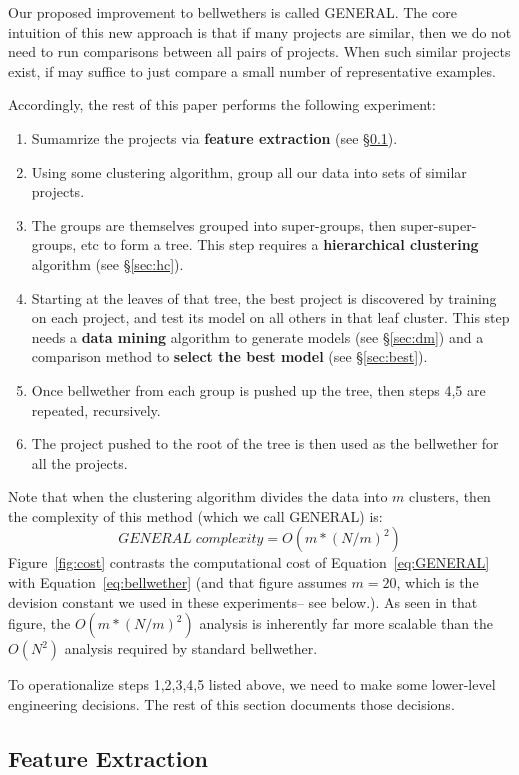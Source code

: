 \documentclass[10pt,journal,compsoc]{IEEEtran}
\newcommand{\fig}[1]{Figure~\ref{fig:#1}}
\newcommand{\be}{\begin{enumerate}}
\newcommand{\ee}{\end{enumerate}}
\begin{document}
 Our proposed improvement to bellwethers is called GENERAL. The core intuition of this new approach is that if many projects are similar, then we do not need to run comparisons between all pairs of projects. When such similar projects exist, if may suffice to just compare a small number of   representative examples. 
 
 Accordingly, the rest of this paper performs the following experiment:
 \be
 \item Sumamrize the projects via {\bf feature extraction} (see \S\ref{sec:fx}).
 \item Using some clustering algorithm, group all our data into sets of similar projects.
 \item The groups are themselves grouped into super-groups, then super-super-groups, etc to form a tree.  This step requires a {\bf hierarchical clustering} algorithm (see \S\ref{sec:hc}).
 \item Starting at the leaves of that tree,   the best project is discovered by training on each project, and test its model
 on all others in that leaf cluster.
 This step needs
  a {\bf data mining} algorithm to generate models (see \S\ref{sec:dm})
 and  a comparison method to {\bf select the best model} (see \S\ref{sec:best}).
 \item  Once bellwether from each group is  pushed up the tree, then steps 4,5 are repeated,
 recursively.
 \item The project pushed to the root of the tree is then used as  the bellwether for all the projects.
 \ee
 Note that when the clustering algorithm divides the data into $m$ clusters, then the complexity of this method (which we call GENERAL) is: 
 \begin{equation}
\label{eq:GENERAL}
    {GENERAL\; complexity } =  O(m*(N/m)^2)
\end{equation}
 \fig{cost} contrasts the computational cost of Equation~\ref{eq:GENERAL} with Equation~\ref{eq:bellwether}   
 (and that figure assumes $m=20$, which is the devision constant we used in these experiments-- see below.).
 As seen in that figure,  the $O(m*(N/m)^2)$ analysis is inherently far more scalable than the $O(N^2)$ analysis  required by standard bellwether.
 
To operationalize steps 1,2,3,4,5 listed above, we need to make some lower-level engineering decisions. The rest of this section documents those decisions.

\subsection{Feature Extraction}\label{sec:fx}
\end{document}
